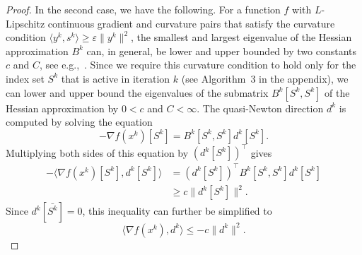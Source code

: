 \documentclass[letterpaper]{article} %
\newcommand{\vareps}{\varepsilon}
\newcommand{\sprod}[2]{\langle{#1}, {#2}\rangle}
\begin{document}
\begin{proof}
In the second case, we have the following. For a function $f$ with $L$-Lipschitz continuous gradient and curvature pairs that satisfy the curvature condition $\sprod{y^k}{s^k}\geq \vareps \|y^k\|^2$, the smallest and largest eigenvalue of the Hessian approximation $B^k$ can, in general, be lower and upper bounded by two constants $c$ and $C$, see e.g.,~\cite{MokhtariR15}. Since we require this curvature condition to hold only for the index set $S^k$ that is active in iteration $k$ (see Algorithm~3 in the appendix), we can lower and upper bound the eigenvalues of the submatrix $B^k[S^k, S^k]$ of the Hessian approximation by $0<c$ and $C<\infty$. %
The quasi-Newton direction $d^k$ is computed by solving the equation
\[
-\nabla f(x^k)[S^k]=B^k[S^k, S^k] d^k[S^k].
\]
Multiplying both sides of this equation by $\left(d^k[S^k]\right)^\top$ gives
\[
\begin{split}
-\sprod{\nabla f(x^k)[S^k]}{d^k[S^k]} &=\left(d^k[S^k]\right)^\top B^k[S^k, S^k] d^k[S^k] \\ & \geq c\|d^k[S^k]\|^2.
\end{split}
\] 
Since $d^k[\bar{S^k}]=0$, this inequality can further be simplified to
\begin{equation}\label{eq:1}
\sprod{\nabla f(x^k)}{d^k}  \leq -c\|d^k\|^2.
\end{equation}


\end{proof}
\end{document}

